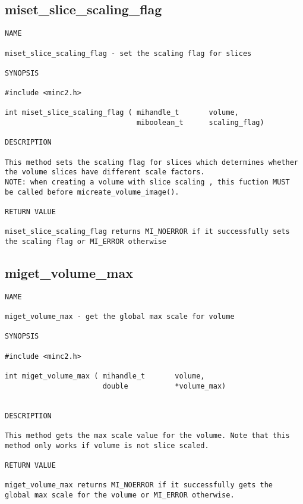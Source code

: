 \documentclass{article}
\begin{document}
\subsection{miset\_slice\_scaling\_flag}
\begin{verbatim}
NAME 

miset_slice_scaling_flag - set the scaling flag for slices

SYNOPSIS

#include <minc2.h>

int miset_slice_scaling_flag ( mihandle_t       volume,
                               miboolean_t      scaling_flag)
                                
DESCRIPTION

This method sets the scaling flag for slices which determines whether 
the volume slices have different scale factors. 
NOTE: when creating a volume with slice scaling , this fuction MUST
be called before micreate_volume_image().

RETURN VALUE

miset_slice_scaling_flag returns MI_NOERROR if it successfully sets 
the scaling flag or MI_ERROR otherwise
\end{verbatim}

\subsection{miget\_volume\_max}
\begin{verbatim}
NAME

miget_volume_max - get the global max scale for volume

SYNOPSIS

#include <minc2.h>

int miget_volume_max ( mihandle_t       volume,
                       double           *volume_max)


DESCRIPTION

This method gets the max scale value for the volume. Note that this 
method only works if volume is not slice scaled.

RETURN VALUE

miget_volume_max returns MI_NOERROR if it successfully gets the
global max scale for the volume or MI_ERROR otherwise. 
\end{verbatim}
\end{document}
